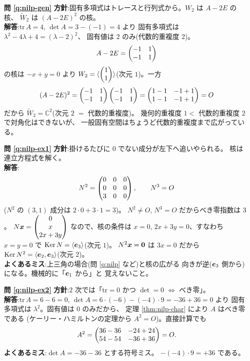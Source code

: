 \bigskip
\noindent\textbf{問 \ref{q:nilp-gen}}\quad
\textbf{方針}:固有多項式はトレースと行列式から。$W_2$ は $A - 2E$ の核、
$\widetilde{W}_2$ は $(A - 2E)^2$ の核。\\
\textbf{解答}:$\mathrm{tr}\,A = 4$, $\det A = 3 - (-1) = 4$ より
固有多項式は $\lambda^2 - 4\lambda + 4 = (\lambda - 2)^2$、
固有値は $2$ のみ(代数的重複度 $2$)。
\[
A - 2E = \begin{pmatrix}-1 & 1 \\ -1 & 1\end{pmatrix}
\]
の核は $-x + y = 0$ より
$W_2 = \langle \begin{pmatrix}1 \\ 1\end{pmatrix} \rangle$(次元 $1$)。一方
\[
(A - 2E)^2 = \begin{pmatrix}-1 & 1 \\ -1 & 1\end{pmatrix}\begin{pmatrix}-1 & 1 \\ -1 & 1\end{pmatrix}
= \begin{pmatrix}1 - 1 & -1 + 1 \\ 1 - 1 & -1 + 1\end{pmatrix} = O
\]
だから $\widetilde{W}_2 = \mathbb{C}^2$(次元 $2$ $=$ 代数的重複度)。
幾何的重複度 $1 <$ 代数的重複度 $2$ で対角化はできないが、
一般固有空間はちょうど代数的重複度まで広がっている。

\bigskip
\noindent\textbf{問 \ref{q:nilp-ex1}}\quad
\textbf{方針}:掛けるたびに $0$ でない成分が左下へ追いやられる。
核は連立方程式を解く。\\
\textbf{解答}:
\[
N^2 = \begin{pmatrix}0 & 0 & 0 \\ 0 & 0 & 0 \\ 3 & 0 & 0\end{pmatrix}, \qquad N^3 = O
\]
($N^2$ の $(3,1)$ 成分は $2 \cdot 0 + 3 \cdot 1 = 3$)。
$N^2 \neq O$, $N^3 = O$ だからべき零指数は $3$。
$N\bm{x} = \begin{pmatrix}0 \\ x \\ 2x + 3y\end{pmatrix}$ なので、核の条件は
$x = 0$, $2x + 3y = 0$、すなわち $x = y = 0$ で
$\mathrm{Ker}\,N = \langle \bm{e}_3 \rangle$(次元 $1$)。
$N^2\bm{x} = \bm{0}$ は $3x = 0$ だから
$\mathrm{Ker}\,N^2 = \langle \bm{e}_2, \bm{e}_3 \rangle$(次元 $2$)。\\
\textbf{よくあるミス}:上三角の場合(問 \ref{q:nilp} など)と核の広がる
向きが逆($\bm{e}_3$ 側から)になる。機械的に「$\bm{e}_1$ から」と
覚えないこと。

\bigskip
\noindent\textbf{問 \ref{q:nilp-ex2}}\quad
\textbf{方針}:$2$ 次では「$\mathrm{tr} = 0$ かつ $\det = 0$ $\iff$ べき零」。\\
\textbf{解答}:$\mathrm{tr}\,A = 6 - 6 = 0$,
$\det A = 6 \cdot (-6) - (-4) \cdot 9 = -36 + 36 = 0$ より
固有多項式は $\lambda^2$。固有値は $0$ のみだから、
定理 \ref{thm:nilp-char} により $A$ はべき零である
(ケーリー・ハミルトンの定理から $A^2 = O$)。直接計算でも
\[
A^2 = \begin{pmatrix}36 - 36 & -24 + 24 \\ 54 - 54 & -36 + 36\end{pmatrix} = O.
\]
\textbf{よくあるミス}:$\det A = -36 - 36$ とする符号ミス。
$-(-4) \cdot 9 = +36$ である。

